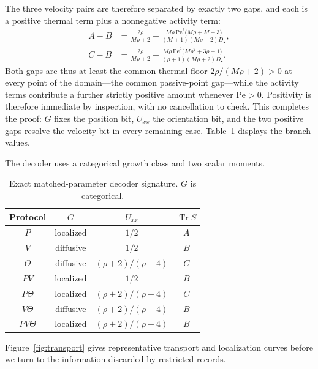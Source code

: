 The three velocity pairs are therefore separated by exactly two gaps, and each is a positive thermal term plus a nonnegative activity term:
\[
\begin{aligned}
A-B&=\frac{2\rho}{M\rho+2}
+\frac{M\rho\,\mathrm{Pe}^2\bigl(M\rho+M+3\bigr)}{(M+1)(M\rho+2)D_\star},\\[3pt]
C-B&=\frac{2\rho}{M\rho+2}
+\frac{M\rho\,\mathrm{Pe}^2\bigl(M\rho^2+3\rho+1\bigr)}{(\rho+1)(M\rho+2)D_\star}.
\end{aligned}
\]
Both gaps are thus at least the common thermal floor $2\rho/(M\rho+2)>0$ at every point of the domain---the common passive-point gap---while the activity terms contribute a further strictly positive amount whenever $\mathrm{Pe}>0$. Positivity is therefore immediate by inspection, with no cancellation to check. This completes the proof: $G$ fixes the position bit, $U_{xx}$ the orientation bit, and the two positive gaps resolve the velocity bit in every remaining case. Table~\ref{tab:decoder} displays the branch values.

The decoder uses a categorical growth class and two scalar moments.

\begin{table}[t]
\caption{Exact matched-parameter decoder signature. $G$ is categorical.}
\centering
\begin{tabular}{c|c|c|c}
Protocol & $G$ & $U_{xx}$ & $\operatorname{Tr}S$\\ \hline
$P$ & localized & $1/2$ & $A$\\
$V$ & diffusive & $1/2$ & $B$\\
$\Theta$ & diffusive & $(\rho+2)/(\rho+4)$ & $C$\\
$PV$ & localized & $1/2$ & $B$\\
$P\Theta$ & localized & $(\rho+2)/(\rho+4)$ & $C$\\
$V\Theta$ & diffusive & $(\rho+2)/(\rho+4)$ & $B$\\
$PV\Theta$ & localized & $(\rho+2)/(\rho+4)$ & $B$
\end{tabular}
\label{tab:decoder}
\end{table}

Figure~\ref{fig:transport} gives representative transport and localization curves before we turn to the information discarded by restricted records.

